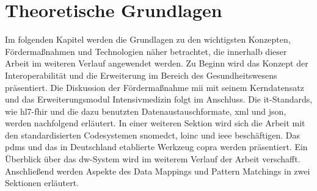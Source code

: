 \chapter{Theoretische Grundlagen} \label{ch:theobasis}

Im folgenden Kapitel werden die Grundlagen zu den wichtigsten Konzepten, Fördermaßnahmen und Technologien näher betrachtet, die innerhalb dieser Arbeit im weiteren Verlauf angewendet werden. Zu Beginn wird das Konzept der Interoperabilität und die Erweiterung im Bereich des Gesundheitswesens präsentiert. Die Diskussion der Fördermaßnahme \glqq \ac{mii}\grqq{} mit seinem Kerndatensatz und das Erweiterungsmodul Intensivmedizin folgt im Anschluss. Die \ac{it}-Standards, wie \ac{hl7}-\ac{fhir} und die dazu benutzten Datenaustauschformate, \ac{xml} und \ac{json}, werden nachfolgend erläutert. In einer weiteren Sektion wird sich die Arbeit mit den standardisierten Codesystemen \ac{snomedct}, \ac{loinc} und \ac{ieee} beschäftigen. Das \ac{pdms} und das in Deutschland etablierte Werkzeug \ac{copra} werden präsentiert. Ein Überblick über das \ac{dw}-System wird im weiterem Verlauf der Arbeit verschafft. Anschließend werden Aspekte des Data Mappings und Pattern Matchings in zwei Sektionen erläutert.